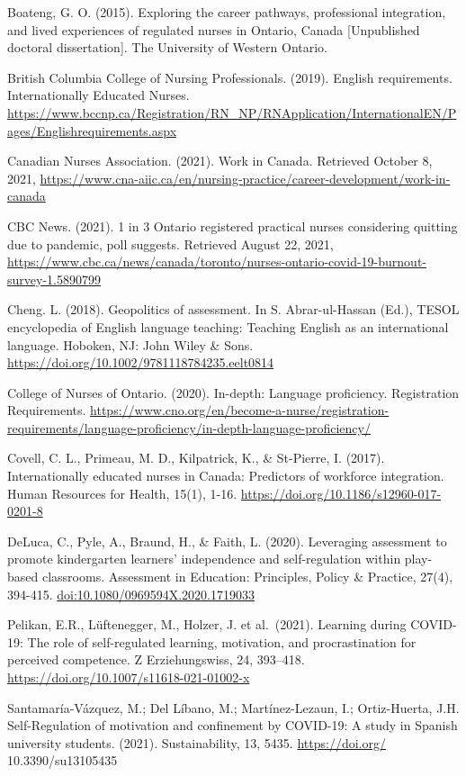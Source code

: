 \documentclass[
]{book}
\begin{document}
Boateng, G. O. (2015). Exploring the career pathways, professional integration, and lived experiences of regulated nurses in Ontario, Canada {[}Unpublished doctoral dissertation{]}. The University of Western Ontario.

British Columbia College of Nursing Professionals. (2019). English requirements. Internationally Educated Nurses. \url{https://www.bccnp.ca/Registration/RN_NP/RNApplication/InternationalEN/Pages/Englishrequirements.aspx}

Canadian Nurses Association. (2021). Work in Canada. Retrieved October 8, 2021, \url{https://www.cna-aiic.ca/en/nursing-practice/career-development/work-in-canada}

CBC News. (2021). 1 in 3 Ontario registered practical nurses considering quitting due to pandemic, poll suggests. Retrieved August 22, 2021, \url{https://www.cbc.ca/news/canada/toronto/nurses-ontario-covid-19-burnout-survey-1.5890799}

Cheng. L. (2018). Geopolitics of assessment. In S. Abrar-ul-Hassan (Ed.), TESOL encyclopedia of English language teaching: Teaching English as an international language. Hoboken, NJ: John Wiley \& Sons. \url{https://doi.org/10.1002/9781118784235.eelt0814}

College of Nurses of Ontario. (2020). In-depth: Language proficiency. Registration Requirements. \url{https://www.cno.org/en/become-a-nurse/registration-requirements/language-proficiency/in-depth-language-proficiency/}

Covell, C. L., Primeau, M. D., Kilpatrick, K., \& St-Pierre, I. (2017). Internationally educated nurses in Canada: Predictors of workforce integration. Human Resources for Health, 15(1), 1-16. \url{https://doi.org/10.1186/s12960-017-0201-8}

DeLuca, C., Pyle, A., Braund, H., \& Faith, L. (2020). Leveraging assessment to promote kindergarten learners' independence and self-regulation within play-based classrooms. Assessment in Education: Principles, Policy \& Practice, 27(4), 394-415. \url{doi:10.1080/0969594X.2020.1719033}

Pelikan, E.R., Lüftenegger, M., Holzer, J. et al.~(2021). Learning during COVID-19: The role of self-regulated learning, motivation, and procrastination for perceived competence. Z Erziehungswiss, 24, 393--418. \url{https://doi.org/10.1007/s11618-021-01002-x}

Santamaría-Vázquez, M.; Del Líbano, M.; Martínez-Lezaun, I.; Ortiz-Huerta, J.H. Self-Regulation of motivation and confinement by COVID-19: A study in Spanish university students. (2021). Sustainability, 13, 5435. \url{https://doi.org/} 10.3390/su13105435
\end{document}
